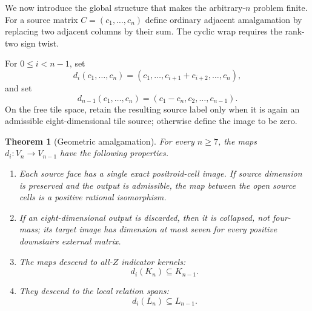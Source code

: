 \documentclass[11pt]{article}
\newtheorem{theorem}{Theorem}[section]
\newcommand{\1}{\mathbf 1}
\begin{document}
We now introduce the global structure that makes the arbitrary-$n$ problem
finite.  For a source matrix $C=(c_1,\dots,c_n)$ define ordinary adjacent
amalgamation by replacing two adjacent columns by their sum.  The cyclic
wrap requires the rank-two sign twist.

For $0\le i<n-1$, set
\begin{equation}\label{eq:facesordinary}
d_i(c_1,\dots,c_n)
=(c_1,\dots,c_{i+1}+c_{i+2},\dots,c_n),
\end{equation}
and set
\begin{equation}\label{eq:facewrap}
d_{n-1}(c_1,\dots,c_n)=(c_1-c_n,c_2,\dots,c_{n-1}).
\end{equation}
On the free tile space, retain the resulting source label only when it is
again an admissible eight-dimensional tile source; otherwise define the
image to be zero.

\begin{theorem}[Geometric amalgamation]\label{thm:amalgamation}
For every $n\ge7$, the maps $d_i:V_n\to V_{n-1}$ have the following
properties.
\begin{enumerate}[label=(\roman*)]
\item Each source face has a single exact positroid-cell image.  If source
dimension is preserved and the output is admissible, the map between the
open source cells is a positive rational isomorphism.
\item If an eight-dimensional output is discarded, then it is collapsed,
not four-mass; its target image has dimension at most seven for every
positive downstairs external matrix.
\item The maps descend to all-$Z$ indicator kernels:
\[
d_i(K_n)\subseteq K_{n-1}.
\]
\item They descend to the local relation spans:
\[
d_i(L_n)\subseteq L_{n-1}.
\]
\end{enumerate}
\end{theorem}
\end{document}
